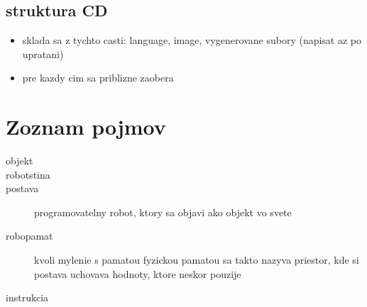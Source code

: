 \documentclass[12pt,notitlepage]{report}
\begin{document}
\section{struktura CD}
\begin{itemize}
\item sklada sa z tychto casti: language, image, vygenerovane subory (napisat az po upratani)
\item pre kazdy cim sa priblizne zaobera
\end{itemize}
\chapter{Zoznam pojmov}
\begin{description}
\item[objekt]
\item[robotstina]
\item[postava]
programovatelny robot, ktory sa objavi ako objekt vo svete
\item[robopamat]
	kvoli mylenie s pamatou fyzickou pamatou sa takto nazyva priestor, kde si postava uchovava hodnoty, ktore neskor pouzije
\item[instrukcia]
\end{description}
\end{document}
